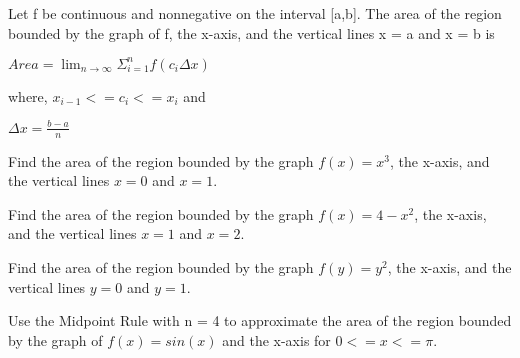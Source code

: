 \documentclass{article}
\theoremstyle{mytheoremstyle}
\theoremstyle{mytheoremstyle}
\theoremstyle{myproblemstyle}
\begin{document}
    \begin{definition}
        Let f be continuous and nonnegative on the interval [a,b]. The area of the region bounded by the graph
        of f, the x-axis, and the vertical lines x = a and x = b is

        $ Area = \lim _{n \to \infty } \Sigma_{i=1}^n f(c_{i}\Delta x) $

        where, $x_{i-1} <= c_{i} <= x_{i}$ and

        $\Delta x = \frac{b-a}{n}$

    \end{definition}

    \begin{problem}
        Find the area of the region bounded by the graph $f(x) = x^3$,
        the x-axis, and the vertical lines $x = 0$ and $x = 1$.
    \end{problem}

    \begin{problem}
        Find the area of the region bounded by the graph $f(x) = 4 - x^2$,
        the x-axis, and the vertical lines $x = 1$ and $x = 2$.
    \end{problem}

    \begin{problem}
        Find the area of the region bounded by the graph $f(y) = y^2$,
        the x-axis, and the vertical lines $y = 0$ and $y = 1$.
    \end{problem}

    \begin{problem}
        Use the Midpoint Rule with n = 4 to approximate the area of the region bounded by the graph of 
        $f(x) = sin(x)$ and the x-axis for $0 <= x <= \pi$.
    \end{problem}
\end{document}
